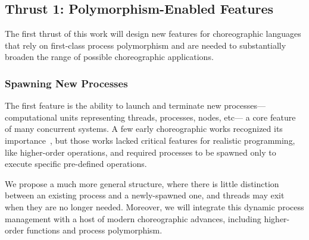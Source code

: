 
\subsection{Thrust 1: Polymorphism-Enabled Features}
\label{sec:t1}

The first thrust of this work will design new features for choreographic languages
that rely on first-class process polymorphism and
are needed to substantially broaden the range of possible choreographic applications.

\subsubsection{Spawning New Processes}
\label{sec:spawning}

The first feature is the ability to launch and terminate new processes---computational units representing threads, processes, nodes, etc---%
a core feature of many concurrent systems.
A few early choreographic works recognized its importance~\citep{CarboneM13,CruzFilipeM16a},
but those works lacked critical features for realistic programming, like higher-order operations,
and required processes to be spawned only to execute specific pre-defined operations.

We propose a much more general structure, where there is little distinction between an existing process and a newly-spawned one,
and threads may exit when they are no longer needed.
Moreover, we will integrate this dynamic process management with a host of modern choreographic advances,
including higher-order functions and process polymorphism.

